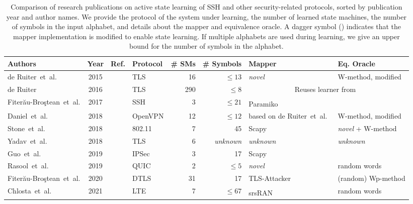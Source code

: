 \newcommand{\adapted}{\textsuperscript{\textdagger}}
\begin{table}
    \centering
    \small
    \caption{Comparison of research publications on active state learning of SSH and other security-related protocols, sorted by publication year and author names. We provide the protocol of the system under learning, the number of learned state machines, the number of symbols in the input alphabet, and details about the mapper and equivalence oracle. A dagger symbol (\textdagger) indicates that the mapper implementation is modified to enable state learning. If multiple alphabets are used during learning, we give an upper bound for the number of symbols in the alphabet.}
    \label{tab:related}
    \begin{tabular}{lcclrrll}
        \toprule
        Authors & Year & Ref. & Protocol & \# SMs & \# Symbols & Mapper & Eq. Oracle \\
        \midrule
        de Ruiter~et~al. & 2015 & \cite{USENIX:dRuPol15} & TLS & 16 & $\leq 13$ & \emph{novel} & W-method, modified  \\
        de Ruiter & 2016 & \cite{SecITSys:dRu16} & TLS & 290 & $\leq 8$ & \multicolumn{2}{c}{\cellcolor{black!10} Reuses learner from~\cite{USENIX:dRuPol15}} \\
        Fiter\u{a}u-Bro\c{s}tean~et~al. & 2017 & \cite{SPIN:fiterauSshModelChecking} & SSH & 3 & $\leq 21$ & Paramiko\adapted & \cite{automatalearning-ecs} \\
        Daniel~et~al. & 2018 & \cite{danielopenvpnstatelearning} & OpenVPN & 12 & $\leq 12$ & based on de Ruiter~et~al.~\cite{USENIX:dRuPol15} & W-method, modified \\
        Stone~et~al. & 2018 & \cite{ESORICS:StoChodRu18} & 802.11 & 7 & 45 & Scapy & \emph{novel} + W-method \\
        Yadav~et~al. & 2018 & \cite{SSCC:YadSad19} & TLS & 6 & \emph{unknown} & \emph{unknown} & \emph{unknown} \\
        Guo~et~al. & 2019 & \cite{8913552} & IPSec & 3 & 17 & Scapy & \cite{533956} \\
        Rasool~et~al. & 2019 & \cite{rasool2019state} & QUIC & 2 & $\leq 5$ & \emph{novel} & random words \\
        Fiter\u{a}u-Bro\c{s}tean~et~al. & 2020 & \cite{USENIX:FJMRSS20} & DTLS & 31 & 17 & TLS-Attacker~\cite{2024TLSAttacker} & (random) Wp-method \\
        Chlosta~et~al. & 2021 & \cite{WISEC:ChlRupHol21} & LTE & 7 & $\leq 67$ & srsRAN\adapted & random words \\

\end{tabular}
\end{table}
